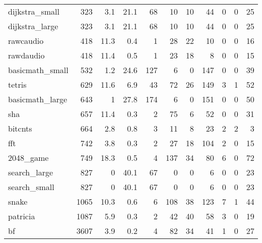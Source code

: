 \begin{tabular}{lrrrrrrrrrr}
 dijkstra\_small  &            323 &      3.1 &   21.1 &   68 &     10 &         10 &           44 &     0 &     0 &    25 \\
 dijkstra\_large  &            323 &      3.1 &   21.1 &   68 &     10 &         10 &           44 &     0 &     0 &    25 \\
 rawcaudio       &            418 &     11.3 &    0.4 &    1 &     28 &         22 &           10 &     0 &     0 &    16 \\
 rawdaudio       &            418 &     11.4 &    0.5 &    1 &     23 &         18 &            8 &     0 &     0 &    15 \\
 basicmath\_small &            532 &      1.2 &   24.6 &  127 &      6 &          0 &          147 &     0 &     0 &    39 \\
 tetris          &            629 &     11.6 &    6.9 &   43 &     72 &         26 &          149 &     3 &     1 &    52 \\
 basicmath\_large &            643 &      1   &   27.8 &  174 &      6 &          0 &          151 &     0 &     0 &    50 \\
 sha             &            657 &     11.4 &    0.3 &    2 &     75 &          6 &           52 &     0 &     0 &    31 \\
 bitcnts         &            664 &      2.8 &    0.8 &    3 &     11 &          8 &           23 &     2 &     2 &     3 \\
 fft             &            742 &      3.8 &    0.3 &    2 &     27 &         18 &          104 &     2 &     0 &    15 \\
 2048\_game       &            749 &     18.3 &    0.5 &    4 &    137 &         34 &           80 &     6 &     0 &    72 \\
 search\_large    &            827 &      0   &   40.1 &   67 &      0 &          0 &            6 &     0 &     0 &    23 \\
 search\_small    &            827 &      0   &   40.1 &   67 &      0 &          0 &            6 &     0 &     0 &    23 \\
 snake           &           1065 &     10.3 &    0.6 &    6 &    108 &         38 &          123 &     7 &     1 &    44 \\
 patricia        &           1087 &      5.9 &    0.3 &    2 &     42 &         40 &           58 &     3 &     0 &    19 \\
 bf              &           3607 &      3.9 &    0.2 &    4 &     82 &         34 &           41 &     1 &     0 &    27 \\

\end{tabular}
